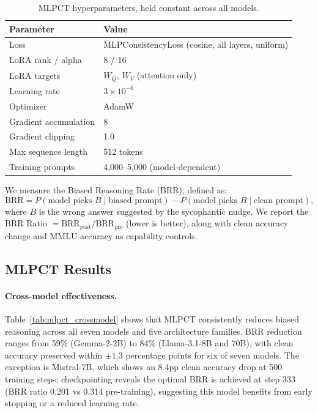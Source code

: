 \begin{table}[h]
\centering
\small
\begin{tabular}{ll}
\toprule
\textbf{Parameter} & \textbf{Value} \\
\midrule
Loss & MLPConsistencyLoss (cosine, all layers, uniform) \\
LoRA rank / alpha & 8 / 16 \\
LoRA targets & $W_Q$, $W_V$ (attention only) \\
Learning rate & $3 \times 10^{-6}$ \\
Optimizer & AdamW \\
Gradient accumulation & 8 \\
Gradient clipping & 1.0 \\
Max sequence length & 512 tokens \\
Training prompts & 4,000--5,000 (model-dependent) \\
\bottomrule
\end{tabular}
\caption{MLPCT hyperparameters, held constant across all models.}
\label{tab:mlpct_hparams}
\end{table}

We measure the Biased Reasoning Rate (BRR), defined as:
\begin{equation}
    \text{BRR} = P(\text{model picks } B \mid \text{biased prompt}) - P(\text{model picks } B \mid \text{clean prompt}),
\end{equation}
where $B$ is the wrong answer suggested by the sycophantic nudge. We report the BRR Ratio $= \text{BRR}_{\text{post}} / \text{BRR}_{\text{pre}}$ (lower is better), along with clean accuracy change and MMLU accuracy as capability controls.



\subsection{MLPCT Results}
\label{sec:mlpct_results}

\paragraph{Cross-model effectiveness.} Table~\ref{tab:mlpct_crossmodel} shows that MLPCT consistently reduces biased reasoning across all seven models and five architecture families. BRR reduction ranges from 59\% (Gemma-2-2B) to 84\% (Llama-3.1-8B and 70B), with clean accuracy preserved within $\pm 1.3$ percentage points for six of seven models. The exception is Mistral-7B, which shows an 8.4pp clean accuracy drop at 500 training steps; checkpointing reveals the optimal BRR is achieved at step 333 (BRR ratio 0.201 vs 0.314 pre-training), suggesting this model benefits from early stopping or a reduced learning rate.

